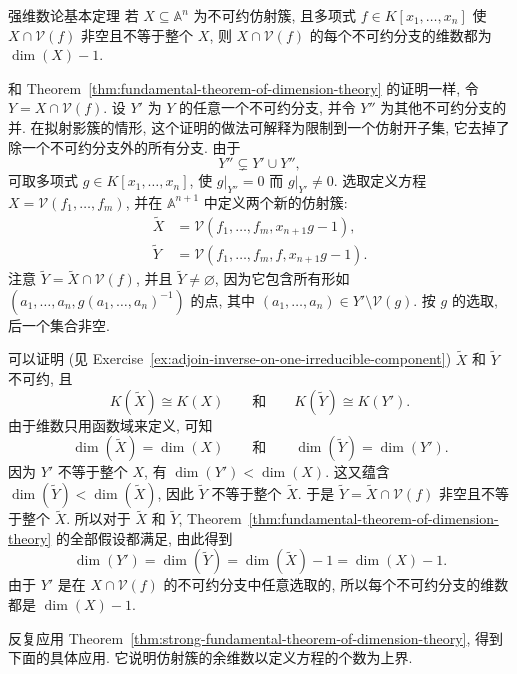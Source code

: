 \begin{Theorem}{强维数论基本定理}\leavevmode\label{thm:strong-fundamental-theorem-of-dimension-theory}
若 $X\subseteq\mathbb{A}^{n}$ 为不可约仿射簇, 且多项式 $f\in K[x_{1},\ldots,x_{n}]$ 使 $X\cap\mathcal{V}(f)$ 非空且不等于整个 $X$, 则 $X\cap\mathcal{V}(f)$ 的每个不可约分支的维数都为 $\dim(X)-1$.
\end{Theorem}
\begin{Proof}
\BookPairedNote
  {和 Theorem~\ref{thm:fundamental-theorem-of-dimension-theory} 的证明一样, 令 $Y=X\cap\mathcal{V}(f)$. 设 $Y'$ 为 $Y$ 的任意一个不可约分支, 并令 $Y''$ 为其他不可约分支的并.}
  {在拟射影簇的情形, 这个证明的做法可解释为限制到一个\textquotedbl{}仿射开子集\textquotedbl{}, 它去掉了除一个不可约分支外的所有分支.}
由于
\[
  Y''\subsetneq Y'\cup Y'',
\]
可取多项式 $g\in K[x_{1},\ldots,x_{n}]$, 使 $g|_{Y''}=0$ 而 $g|_{Y'}\neq0$. 选取定义方程 $X=\mathcal{V}(f_{1},\ldots,f_{m})$, 并在 $\mathbb{A}^{n+1}$ 中定义两个新的仿射簇:
\[
  \begin{aligned}
    \widetilde{X}&=\mathcal{V}(f_{1},\ldots,f_{m},x_{n+1}g-1),\\
    \widetilde{Y}&=\mathcal{V}(f_{1},\ldots,f_{m},f,x_{n+1}g-1).
  \end{aligned}
\]
注意 $\widetilde{Y}=\widetilde{X}\cap\mathcal{V}(f)$, 并且 $\widetilde{Y}\neq\varnothing$, 因为它包含所有形如 $(a_{1},\ldots,a_{n},g(a_{1},\ldots,a_{n})^{-1})$ 的点, 其中 $(a_{1},\ldots,a_{n})\in Y'\setminus\mathcal{V}(g)$. 按 $g$ 的选取, 后一个集合非空.

可以证明 (见 Exercise~\ref{ex:adjoin-inverse-on-one-irreducible-component}) $\widetilde{X}$ 和 $\widetilde{Y}$ 不可约, 且
\[
  K(\widetilde{X})\cong K(X)
  \qquad\text{和}\qquad K(\widetilde{Y})\cong K(Y').
\]
由于维数只用函数域来定义, 可知
\[
  \dim(\widetilde{X})=\dim(X)
  \qquad\text{和}\qquad\dim(\widetilde{Y})=\dim(Y').
\]
因为 $Y'$ 不等于整个 $X$, 有 $\dim(Y')<\dim(X)$. 这又蕴含 $\dim(\widetilde{Y})<\dim(\widetilde{X})$, 因此 $\widetilde{Y}$ 不等于整个 $\widetilde{X}$. 于是 $\widetilde{Y}=\widetilde{X}\cap\mathcal{V}(f)$ 非空且不等于整个 $\widetilde{X}$. 所以对于 $\widetilde{X}$ 和 $\widetilde{Y}$, Theorem~\ref{thm:fundamental-theorem-of-dimension-theory} 的全部假设都满足, 由此得到
\[
  \dim(Y')=\dim(\widetilde{Y})=\dim(\widetilde{X})-1=\dim(X)-1.
\]
由于 $Y'$ 是在 $X\cap\mathcal{V}(f)$ 的不可约分支中任意选取的, 所以每个不可约分支的维数都是 $\dim(X)-1$.
\end{Proof}

反复应用 Theorem~\ref{thm:strong-fundamental-theorem-of-dimension-theory}, 得到下面的具体应用. 它说明仿射簇的余维数以定义方程的个数为上界.

